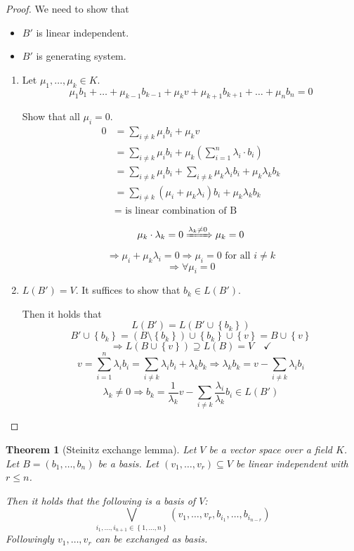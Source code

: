 \documentclass[a4paper,landscape,twocolumn]{article}
\newcommand\set[1]{\left\{#1\right\}}
\newtheorem{theorem}{Theorem}
\begin{document}
\begin{proof}
  We need to show that
  \begin{itemize}
    \item $B'$ is linear independent.
    \item $B'$ is generating system.
  \end{itemize}

  \begin{enumerate}
    \item
      Let $\mu_1, \dots, \mu_k \in K$.
      \[ \mu_1 b_1 + \ldots + \mu_{k-1} b_{k-1} + \mu_k v + \mu_{k+1} b_{k+1} + \dots + \mu_n b_n = 0 \]

      Show that all $\mu_i = 0$.
      \begin{align*}
        0 &= \sum_{i \neq k} \mu_i b_i + \mu_k v \\
          &= \sum_{i \neq k} \mu_i b_i + \mu_k \left(\sum_{i=1}^n \lambda_i \cdot b_i\right) \\
          &= \sum_{i \neq k} \mu_i b_i + \sum_{i \neq k} \mu_k \lambda_i b_i + \mu_k \lambda_k b_k \\
          &= \sum_{i \neq k} (\mu_i + \mu_k \lambda_i) b_i + \mu_k \lambda_k b_k \\
          &= \text{ is linear combination of B}
      \end{align*}

      \[ \mu_k \cdot \lambda_k = 0 \xRightarrow{\lambda_k \neq 0} \mu_k = 0 \]
      \[ \Rightarrow \mu_i + \mu_k \lambda_i = 0 \Rightarrow \mu_i = 0 \text{ for all } i \neq k \]
      \[ \Rightarrow \forall \mu_i = 0 \]
    \item $L(B') = V$.
      It suffices to show that $b_k \in L(B')$.

      Then it holds that
      \[ L(B') = L(B' \cup \set{b_k}) \]
      \[ B' \cup \set{b_k} = (B \setminus \set{b_k}) \cup \set{b_k} \cup \set{v} = B \cup \set{v} \]
      \[ \Rightarrow L(B \cup \set{v}) \supseteq L(B) = V \quad\checkmark \]
      \[ v = \sum_{i=1}^n \lambda_i b_i = \sum_{i \neq k} \lambda_i b_i + \lambda_k b_k  \Rightarrow \lambda_k b_k = v - \sum_{i \neq k} \lambda_i b_i \]
      \[ \lambda_k \neq 0 \Rightarrow b_k = \frac{1}{\lambda_k} v - \sum_{i \neq k} \frac{\lambda_i}{\lambda_k} b_i \in L(B') \]
  \end{enumerate}
\end{proof}

\begin{theorem}[Steinitz exchange lemma]
  \label{steinitz-lemma}
  Let $V$ be a vector space over a field $K$.
  Let $B = (b_1, \ldots, b_n)$ be a basis.
  Let $(v_1, \dots, v_r) \subseteq V$ be linear independent with $r \leq n$.

  Then it holds that the following is a basis of $V$:
  \[ \bigvee_{i_1, \dots, i_{n+1} \in \set{1, \dots, n}} (v_1, \dots, v_r, b_{i_1}, \dots, b_{i_{n-r}}) \]
  Followingly $v_1, \dots, v_r$ can be exchanged as basis.
\end{theorem}
\end{document}
